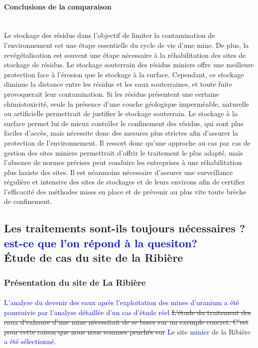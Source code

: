 \documentclass{article}
\newcommand{\blue}[1]{\textcolor{blue}{#1}} %
\begin{document}
\paragraph{Conclusions de la comparaison \\ \\}
Le stockage des résidus dans l’objectif de limiter la contamination de l’environnement est une étape essentielle du cycle de vie d’une mine.
De plus, la revégétalisation est souvent une étape nécessaire à la réhabilitation des sites de stockage de résidus.
Le stockage souterrain des résidus miniers offre une meilleure protection face à l’érosion que le stockage à la surface. Cependant, ce stockage diminue la distance entre les résidus et les eaux souterraines, et toute fuite provoquerait leur contamination. Si les résidus présentent une certaine chimiotoxicité, seule la présence d’une couche géologique imperméable, naturelle ou artificielle permettrait de justifier le stockage souterrain. Le stockage à la surface permet lui de mieux contrôler le confinement des résidus, qui sont plus faciles d’accès, mais nécessite donc des mesures plus strictes afin d’assurer la protection de l’environnement.
Il ressort donc qu’une approche au cas par cas de gestion des sites miniers permettrait d’offrir le traitement le plus adapté, mais l’absence de normes précises peut conduire les entreprises à une réhabilitation plus laxiste des sites.
Il est néanmoins nécessaire d’assurer une surveillance régulière et intensive des sites de stockages et de leurs environs afin de certifier l’efficacité des méthodes mises en place et de prévenir au plus vite toute brèche de confinement.


\subsection{Les traitements sont-ils toujours nécessaires ? \blue{est-ce que l'on répond à la quesiton?} \\ Étude de cas du site de la Ribière}%
\subsubsection{Présentation du site de La Ribière}
\paragraph{} \blue{L'analyse du devenir des eaux après l'exploitation des mines d'uranium a été poursuivie par l'analyse détaillée d'un cas d'étude réel} \sout{L’étude du traitement des eaux d’exhaure d’une mine nécessitait de se baser sur un exemple concret. C’est pour cette raison que nous nous sommes penchés sur} \blue{L}e site \blue{minier} de la Ribière \blue{a été sélectionné}. 
\end{document}
